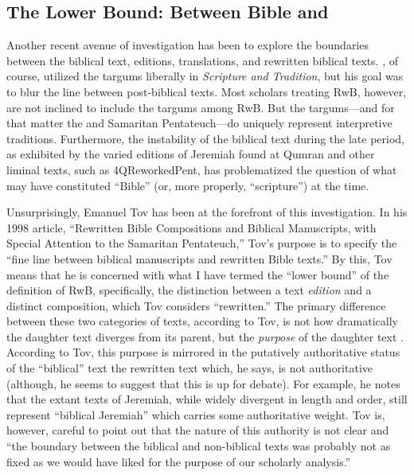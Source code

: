 
\subsection{The Lower Bound: Between Bible and \RWB}

Another recent avenue of investigation has been to explore the boundaries between the biblical text, editions, translations, and rewritten biblical texts. \vermes, of course, utilized the targums liberally in \emph{Scripture and Tradition}, but his goal was to blur the line between post-biblical texts. Most scholars treating RwB, however, are not inclined to include the targums among RwB. But the targums---and for that matter the \lxx and Samaritan Pentateuch---do uniquely represent interpretive traditions. Furthermore, the instability of the biblical text during the late \secondtemple period, as exhibited by the varied editions of Jeremiah found at Qumran and other liminal texts, such as 4QReworkedPent, has problematized the question of what may have constituted ``Bible'' (or, more properly, ``scripture'') at the time. 

Unsurprisingly, Emanuel Tov has been at the forefront of this investigation. In his 1998 article, ``Rewritten Bible Compositions and Biblical Manuscripts, with Special Attention to the Samaritan Pentateuch,'' Tov's purpose is to specify the ``fine line between biblical manuscripts and rewritten Bible texts.''\autocite[334]{tov_dsd1998} By this, Tov means that he is concerned with what I have termed the ``lower bound'' of the definition of RwB, specifically, the distinction between a text \emph{edition} and a distinct composition, which Tov considers ``rewritten.'' The primary difference between these two categories of texts, according to Tov, is not how dramatically the daughter text diverges from its parent, but the \emph{purpose} of the daughter text \autocite[334]{tov_dsd1998}. According to Tov, this purpose is mirrored in the putatively authoritative status of the ``biblical'' text \visavis the rewritten text which, he says, is not authoritative (although, he seems to suggest that this is up for debate\autocite[337]{tov_dsd1998}). For example, he notes that the extant texts of Jeremiah, while widely divergent in length and order, still represent ``biblical Jeremiah'' which carries some authoritative weight. Tov is, however, careful to point out that the nature of this authority is not clear and ``the boundary between the biblical and non-biblical texts was probably not as fixed as we would have liked for the purpose of our scholarly analysis.''\autocite[335]{tov_dsd1998} 

